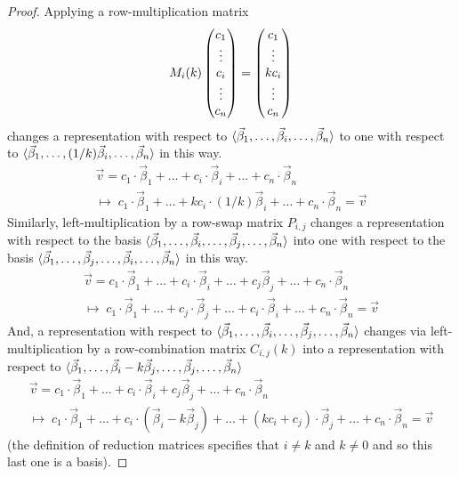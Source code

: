 \begin{proof}
Applying a row-multiplication matrix
\begin{equation*}
  M_{i}(k)
    \begin{pmatrix} 
       c_1     \\
       \vdots  \\
       c_i    \\
       \vdots  \\
       c_n   \end{pmatrix}
  =
    \begin{pmatrix} 
       c_1     \\
       \vdots  \\
       kc_i    \\
       \vdots  \\
       c_n   \end{pmatrix}
\end{equation*}
changes a representation with respect to
\( \langle\vec{\beta}_1,\dots,\vec{\beta}_i,\dots,\vec{\beta}_n \rangle \)
to one with respect to
\( \langle\vec{\beta}_1,\dots,(1/k)\vec{\beta}_i,\dots,\vec{\beta}_n \rangle \)
in this way.
\begin{multline*}
   \vec{v}= c_1\cdot\vec{\beta}_1+\dots+c_i\cdot\vec{\beta}_i
                                   +\dots+c_n\cdot\vec{\beta}_n  
   \\  \mapsto\;                                                       
    c_1\cdot\vec{\beta}_1+\dots+kc_i\cdot(1/k)\vec{\beta}_i+\dots
                                  +c_n\cdot\vec{\beta}_n=\vec{v}     
\end{multline*}
Similarly, left-multiplication by a row-swap matrix $P_{i,j}$
changes a representation with respect to the basis
\( \langle\vec{\beta}_1,\dots,\vec{\beta}_i,\dots,\vec{\beta}_j,
  \dots,\vec{\beta}_n \rangle \)
into one with respect to the basis
\( \langle\vec{\beta}_1,\dots,\vec{\beta}_j,\dots,\vec{\beta}_i,
  \dots,\vec{\beta}_n \rangle \) in this way.
\begin{multline*}
   \vec{v}= c_1\cdot\vec{\beta}_1+\dots+c_i\cdot\vec{\beta}_i
                   +\dots+c_j\vec{\beta}_j+\dots+c_n\cdot\vec{\beta}_n  
   \\  \mapsto\;                                                       
    c_1\cdot\vec{\beta}_1+\dots+c_j\cdot\vec{\beta}_j+\dots
               +c_i\cdot\vec{\beta}_i+\dots+c_n\cdot\vec{\beta}_n=\vec{v}     
\end{multline*}
And, a representation with respect to
\( \langle\vec{\beta}_1,\dots,\vec{\beta}_i,\dots,\vec{\beta}_j,
  \dots,\vec{\beta}_n \rangle \)
changes via left-multiplication by a row-combination matrix
$C_{i,j}(k)$ into a representation with respect to
\( \langle\vec{\beta}_1,\dots,\vec{\beta}_i-k\vec{\beta}_j,
  \dots,\vec{\beta}_j,\dots,\vec{\beta}_n \rangle \)
\begin{multline*}
   \vec{v}= c_1\cdot\vec{\beta}_1+\dots+c_i\cdot\vec{\beta}_i
                       +c_j\vec{\beta}_j+\dots+c_n\cdot\vec{\beta}_n  
   \\  \mapsto\;                                                       
    c_1\cdot\vec{\beta}_1+\dots+c_i\cdot(\vec{\beta}_i-k\vec{\beta}_j)+\dots
          +(kc_i+c_j)\cdot\vec{\beta}_j+\dots+c_n\cdot\vec{\beta}_n=\vec{v} 
\end{multline*}
(the definition of reduction matrices specifies that \( i\neq k \) and
\( k\neq 0 \) and so this last one is a basis).
\end{proof}

